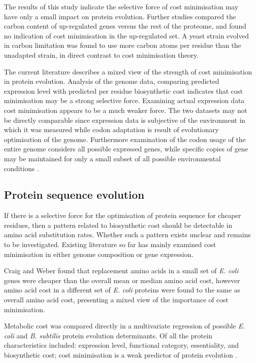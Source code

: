 The results of this study indicate the selective force of cost minimisation may have only a small impact on protein evolution. Further studies \cite{bragg2007} compared the carbon content of up-regulated genes versus the rest of the proteome, and found no indication of cost minimisation in the up-regulated set. A yeast strain evolved in carbon limitation was found to use more carbon atoms per residue than the unadapted strain, in direct contrast to cost minimisation theory.

The current literature describes a mixed view of the strength of cost minimisation in protein evolution. Analysis of the genome data, comparing predicted expression level with predicted per residue biosynthetic cost indicates that cost minimisation may be a strong selective force. Examining actual expression data cost minimisation appears to be a much weaker force. The two datasets may not be directly comparable since expression data is subjective of the environment in which it was measured while codon adaptation is result of evolutionary optimisation of the genome. Furthermore examination of the codon usage of the entire genome considers all possible expressed genes, while specific copies of gene may be maintained for only a small subset of all possible environmental conditions \cite{sanchez2008}.

\subsection{Protein sequence evolution}

If there is a selective force for the optimisation of protein sequence for cheaper residues, then a pattern related to biosynthetic cost should be detectable in amino acid substitution rates. Whether such a pattern exists unclear and remains to be investigated. Existing literature so far has mainly examined cost minimisation in either genome composition or gene expression.

Craig and Weber \cite{craig1998} found that replacement amino acids in a small set of \emph{E. coli} genes were cheaper than the overall mean or median amino acid cost, however amino acid cost in a different set of \emph{E. coli} proteins were found to the same as overall amino acid cost, presenting a mixed view of the importance of cost minimisation.

Metabolic cost was compared directly in a multivariate regression of possible \emph{E. coli} and \emph{B. subtilis} protein evolution determinants. Of all the protein characteristics included: expression level, functional category, essentiality, and biosynthetic cost; cost minimisation is a weak predictor of protein evolution \cite{rocha2004}.

